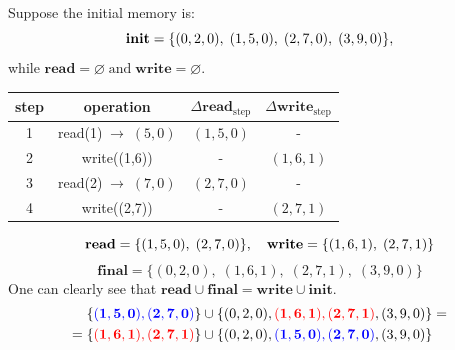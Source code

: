 \documentclass{zkdl-presentation-template}
\begin{document}
    \begin{frame}
        \begin{example}
            Suppose the initial memory is:
            \vspace{-5px}
            \begin{equation*}
                \mathbf{init} =\{(0,2,0), \; (1,5,0), \; (2,7,0), \; (3,9,0)\},
                \vspace{-5px}
            \end{equation*}
            while $\mathbf{read} = \varnothing \; \text{and} \; \mathbf{write} = \varnothing$.

            \pause
            \vspace{6px}
            \begin{center}
                \begin{tabular}{c|c|c|c}
                \textbf{step} & \textbf{operation} & $\Delta\mathbf{read}_{\text{step}}$ & $\Delta\mathbf{write}_{\text{step}}$\\\hline
                1 & read(1)$  \; \to \; (5, 0)$ & $(1,5,0)$ & -        \\
                2 & write((1,6))                & -         & $(1,6,1)$\\
                3 & read(2)$  \; \to \; (7, 0)$ & $(2,7,0)$ & -        \\
                4 & write((2,7))                & -         & $(2,7,1)$\\
                \end{tabular}
            \end{center}
            \pause
            \vspace{5px}
            \begin{equation*}
                \mathbf{read} = \{(1,5,0), \; (2,7,0)\},\quad
                \mathbf{write} = \{(1,6,1), \; (2,7,1)\}
                \vspace{-5px}
            \end{equation*}
            \begin{equation*}
                \mathbf{final} = \{(0,2,0), \; (1,6,1), \; (2,7,1), \; (3,9,0)\}
            \end{equation*}
            \pause
            One can clearly see that $\mathbf{read} \cup \mathbf{final} = \mathbf{write} \cup \mathbf{init}$.
            \vspace{-5px}
            \begin{align*}
                \{\textcolor{blue}{\mathbf{(1,5,0), (2,7,0)}}\} &\cup \{(0,2,0), \textcolor{red}{\mathbf{(1,6,1), (2,7,1)}}, (3,9,0)\} = \\
                = \{\textcolor{red}{\mathbf{(1,6,1), (2,7,1)}}\} &\cup \{(0,2,0), \textcolor{blue}{\mathbf{(1,5,0), (2,7,0)}}, (3,9,0)\}
            \end{align*}
        \end{example}
    \end{frame}
\end{document}

